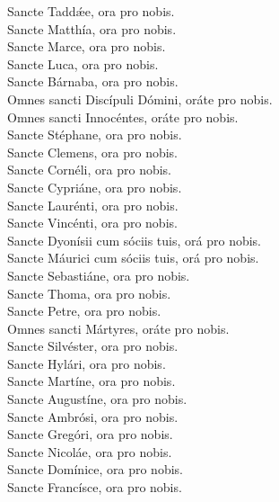 {	Sancte Taddǽe, ora pro nobis. \\
	Sancte Matthía, ora pro nobis. \\
	Sancte Marce, ora pro nobis. \\
	Sancte Luca, ora pro nobis. \\
	Sancte Bárnaba, ora pro nobis. \\
	Omnes sancti Discípuli Dómini, oráte pro nobis. \\
	Omnes sancti Innocéntes, oráte pro nobis. \\
	Sancte Stéphane, ora pro nobis. \\
		Sancte Clemens, ora pro nobis. \\
		Sancte Cornéli, ora pro nobis. \\
		Sancte Cypriáne, ora pro nobis. \\
	Sancte Laurénti, ora pro nobis. \\
	Sancte Vincénti, ora pro nobis. \\
		Sancte Dyonísii cum sóciis tuis, orá pro nobis. \\
		Sancte Máurici cum sóciis tuis, orá pro nobis. \\
		Sancte Sebastiáne, ora pro nobis. \\
		Sancte Thoma, ora pro nobis. \\
		Sancte Petre, ora pro nobis. \\
	Omnes sancti Mártyres, oráte pro nobis. \\
	Sancte Silvéster, ora pro nobis. \\
		Sancte Hylári, ora pro nobis. \\
	Sancte Martíne, ora pro nobis. \\
	Sancte Augustíne, ora pro nobis. \\
	Sancte Ambrósi, ora pro nobis. \\
	Sancte Gregóri, ora pro nobis. \\
	Sancte Nicoláe, ora pro nobis. \\
	Sancte Domínice, ora pro nobis. \\
	Sancte Francísce, ora pro nobis. \\
}

